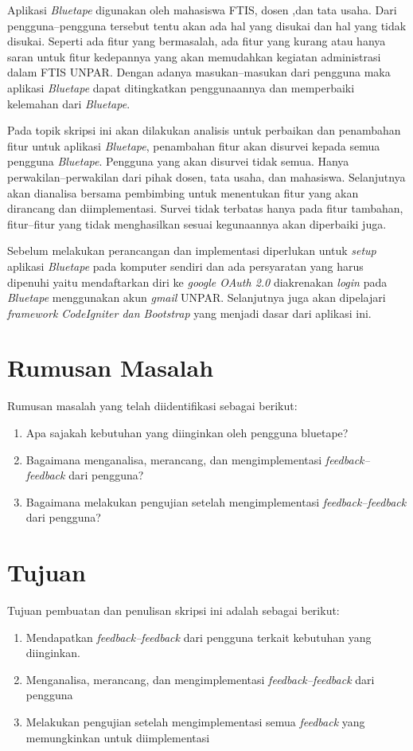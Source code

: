 Aplikasi \textit{Bluetape} digunakan oleh mahasiswa FTIS, dosen ,dan tata usaha. Dari pengguna--pengguna tersebut tentu akan ada hal yang disukai dan hal yang tidak disukai. Seperti ada fitur yang bermasalah, ada fitur yang kurang atau hanya saran untuk fitur kedepannya yang akan memudahkan kegiatan administrasi dalam FTIS UNPAR. Dengan adanya masukan--masukan dari pengguna maka aplikasi \textit{Bluetape} dapat ditingkatkan penggunaannya dan memperbaiki kelemahan dari \textit{Bluetape}.

Pada topik skripsi ini akan dilakukan analisis untuk perbaikan dan penambahan fitur untuk aplikasi \textit{Bluetape}, penambahan fitur akan disurvei kepada semua pengguna \textit{Bluetape}. Pengguna yang akan disurvei tidak semua. Hanya perwakilan--perwakilan dari pihak dosen, tata usaha, dan mahasiswa. Selanjutnya akan dianalisa bersama pembimbing untuk menentukan fitur yang akan dirancang dan diimplementasi. Survei tidak terbatas hanya pada fitur tambahan, fitur--fitur yang tidak menghasilkan sesuai kegunaannya akan diperbaiki juga.


Sebelum melakukan perancangan dan implementasi diperlukan untuk \textit{setup} aplikasi \textit{Bluetape} pada komputer sendiri dan ada persyaratan yang harus dipenuhi yaitu mendaftarkan diri ke \textit{google OAuth 2.0} diakrenakan \textit{login} pada \textit{Bluetape} menggunakan akun \textit{gmail} UNPAR. Selanjutnya juga akan dipelajari \textit{framework CodeIgniter dan Bootstrap} yang menjadi dasar dari aplikasi ini. 

\section{Rumusan Masalah}
\label{sec:rumusan}
Rumusan masalah yang telah diidentifikasi sebagai berikut:
\begin{enumerate}
	\item Apa sajakah kebutuhan yang diinginkan oleh pengguna bluetape?
	\item Bagaimana menganalisa, merancang, dan mengimplementasi \textit{feedback--feedback} dari pengguna?
	\item Bagaimana melakukan pengujian setelah mengimplementasi \textit{feedback--feedback} dari pengguna?

\end{enumerate}

\section{Tujuan}
\label{sec:tujuan}
Tujuan pembuatan dan penulisan skripsi ini adalah sebagai berikut:
\begin{enumerate}
	\item Mendapatkan \textit{feedback--feedback} dari pengguna terkait kebutuhan yang diinginkan.
	\item Menganalisa, merancang, dan mengimplementasi \textit{feedback--feedback} dari pengguna
	\item Melakukan pengujian setelah mengimplementasi semua \textit{feedback} yang memungkinkan untuk diimplementasi

\end{enumerate}

